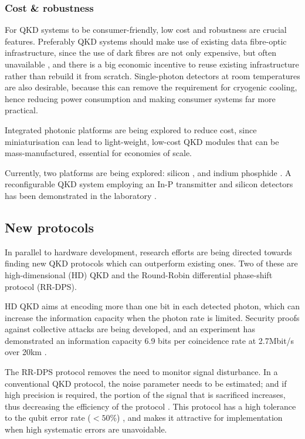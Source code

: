 \subsubsection{Cost \& robustness}
 
For QKD systems to be consumer-friendly, low cost and robustness are crucial features. Preferably QKD systems should make use of existing data fibre-optic infrastructure, since the use of dark fibres are not only expensive, but often unavailable \cite{bib:diamanti2016practical}, and there is a big economic incentive to reuse existing infrastructure rather than rebuild it from scratch. Single-photon detectors at room temperatures are also desirable, because this can remove the requirement for cryogenic cooling, hence reducing power consumption and making consumer systems far more practical.

Integrated photonic platforms are being explored to reduce cost, since miniaturisation can lead to light-weight, low-cost QKD modules that can be mass-manufactured, essential for economies of scale. 

Currently, two platforms are being explored: silicon \cite{bib:lim2014review}, and indium phosphide \cite{bib:smit2014introduction}. A reconfigurable QKD system employing an In-P transmitter and silicon detectors has been demonstrated in the laboratory \cite{bib:sibson2017chip}.

\subsection{New protocols}

In parallel to hardware development, research efforts are being directed towards finding new QKD protocols which can outperform existing ones. Two of these are high-dimensional (HD) QKD and the Round-Robin differential phase-shift protocol (RR-DPS).

HD QKD aims at encoding more than one bit in each detected photon, which can increase the information capacity when the photon rate is limited. Security proofs against collective attacks are being developed, and an experiment has demonstrated an information capacity 6.9 bits per coincidence rate at 2.7Mbit/s over 20km \cite{bib:zhong2015photon}.

The RR-DPS protocol \cite{bib:sasaki2014practical} removes the need to monitor signal disturbance. In a conventional QKD protocol, the noise parameter needs to be estimated; and if high precision is required, the portion of the signal that is sacrificed increases, thus decreasing the efficiency of the protocol \cite{bib:cai2009finite, bib:hayashi2014security}. This protocol has a high tolerance to the qubit error rate ($<50\%$) \cite{bib:xu2015discrete}, and makes it attractive for implementation when high systematic errors are unavoidable.   

